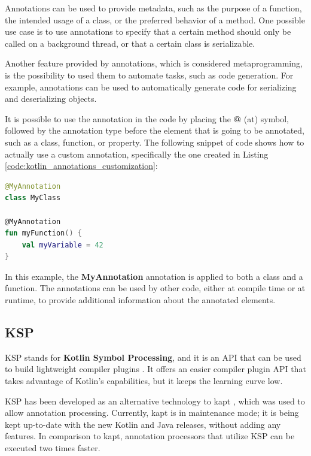 Annotations can be used to provide metadata, such as the purpose of a function, the intended usage of a class, or the preferred behavior of a method. One possible use case is to use annotations to specify that a certain method should only be called on a background thread, or that a certain class is serializable.

Another feature provided by annotations, which is considered metaprogramming, is the possibility to used them to automate tasks, such as code generation. For example, annotations can be used to automatically generate code for serializing and deserializing objects.

It is possible to use the annotation in the code by placing the \textbf{@} (at) symbol, followed by the annotation type before the element that is going to be annotated, such as a class, function, or property.\newline
The following snippet of code shows how to actually use a custom annotation, specifically the one created in Listing \ref{code:kotlin_annotations_customization}:
\begin{lstlisting}[caption={Example of usage of a custom annotation in Kotlin}, language=Kotlin, captionpos=b, label={code:kotlin_annotations_usage}]
@MyAnnotation
class MyClass

@MyAnnotation
fun myFunction() {
    val myVariable = 42
}
\end{lstlisting}
In this example, the \textbf{MyAnnotation} annotation is applied to both a class and a function. The annotations can be used by other code, either at compile time or at runtime, to provide additional information about the annotated elements.

\subsection{KSP}
KSP stands for \textbf{Kotlin Symbol Processing}, and it is an API that can be used to build lightweight compiler plugins \cite{ksp_documentation}. It offers an easier compiler plugin API that takes advantage of Kotlin's capabilities, but it keeps the learning curve low.

KSP has been developed as an alternative technology to kapt \cite{kapt_documentation}, which was used to allow annotation processing. Currently, kapt is in maintenance mode; it is being kept up-to-date with the new Kotlin and Java releases, without adding any features.\newline
In comparison to kapt, annotation processors that utilize KSP can be executed two times faster.

